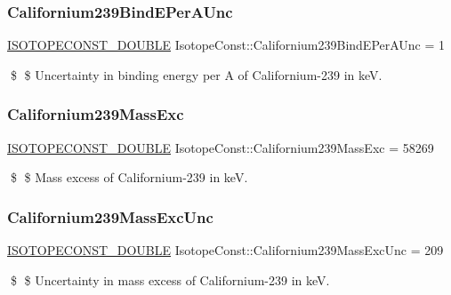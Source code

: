 \subsubsection{\texorpdfstring{Californium239\+Bind\+E\+Per\+A\+Unc}{Californium239BindEPerAUnc}}
{\footnotesize\ttfamily \mbox{\hyperlink{group___isotope_const-_macros_ga8f45a7272ce02c0b4c65c44636ed719a}{I\+S\+O\+T\+O\+P\+E\+C\+O\+N\+S\+T\+\_\+\+D\+O\+U\+B\+LE}} Isotope\+Const\+::\+Californium239\+Bind\+E\+Per\+A\+Unc = 1}

\$ \$ Uncertainty in binding energy per A of Californium-\/239 in keV. \mbox{\label{group___isotope_const-_californium-_cf239_gaddeefaafd117a269e3f37818af322c58}} 
\subsubsection{\texorpdfstring{Californium239\+Mass\+Exc}{Californium239MassExc}}
{\footnotesize\ttfamily \mbox{\hyperlink{group___isotope_const-_macros_ga8f45a7272ce02c0b4c65c44636ed719a}{I\+S\+O\+T\+O\+P\+E\+C\+O\+N\+S\+T\+\_\+\+D\+O\+U\+B\+LE}} Isotope\+Const\+::\+Californium239\+Mass\+Exc = 58269}

\$ \$ Mass excess of Californium-\/239 in keV. \mbox{\label{group___isotope_const-_californium-_cf239_gaeea159a6b02742ee8e03e2f565847a09}} 
\subsubsection{\texorpdfstring{Californium239\+Mass\+Exc\+Unc}{Californium239MassExcUnc}}
{\footnotesize\ttfamily \mbox{\hyperlink{group___isotope_const-_macros_ga8f45a7272ce02c0b4c65c44636ed719a}{I\+S\+O\+T\+O\+P\+E\+C\+O\+N\+S\+T\+\_\+\+D\+O\+U\+B\+LE}} Isotope\+Const\+::\+Californium239\+Mass\+Exc\+Unc = 209}

\$ \$ Uncertainty in mass excess of Californium-\/239 in keV. \mbox{\label{group___isotope_const-_californium-_cf239_ga2d306b036f8483e5d5cc6e6cc9f061ca}} 
